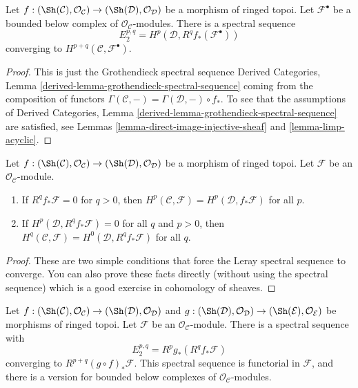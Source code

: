 \begin{lemma}
\label{lemma-Leray}
Let $f : (\Sh(\mathcal{C}), \mathcal{O}_\mathcal{C}) \to
(\Sh(\mathcal{D}), \mathcal{O}_\mathcal{D})$ be a morphism of ringed topoi.
Let $\mathcal{F}^\bullet$ be a bounded below complex of
$\mathcal{O}_\mathcal{C}$-modules. There is a spectral sequence
$$
E_2^{p, q} = H^p(\mathcal{D}, R^qf_*(\mathcal{F}^\bullet))
$$
converging to $H^{p + q}(\mathcal{C}, \mathcal{F}^\bullet)$.
\end{lemma}

\begin{proof}
This is just the Grothendieck spectral sequence
Derived Categories, Lemma \ref{derived-lemma-grothendieck-spectral-sequence}
coming from the composition of functors
$\Gamma(\mathcal{C}, -) = \Gamma(\mathcal{D}, -) \circ f_*$.
To see that the assumptions of
Derived Categories, Lemma \ref{derived-lemma-grothendieck-spectral-sequence}
are satisfied, see
Lemmas \ref{lemma-direct-image-injective-sheaf} and
\ref{lemma-limp-acyclic}.
\end{proof}

\begin{lemma}
\label{lemma-apply-Leray}
Let $f : (\Sh(\mathcal{C}), \mathcal{O}_\mathcal{C}) \to
(\Sh(\mathcal{D}), \mathcal{O}_\mathcal{D})$ be a morphism of ringed topoi.
Let $\mathcal{F}$ be an $\mathcal{O}_\mathcal{C}$-module.
\begin{enumerate}
\item If $R^qf_*\mathcal{F} = 0$ for $q > 0$, then
$H^p(\mathcal{C}, \mathcal{F}) = H^p(\mathcal{D}, f_*\mathcal{F})$ for all $p$.
\item If $H^p(\mathcal{D}, R^qf_*\mathcal{F}) = 0$ for all $q$ and $p > 0$,
then $H^q(\mathcal{C}, \mathcal{F}) = H^0(\mathcal{D}, R^qf_*\mathcal{F})$
for all $q$.
\end{enumerate}
\end{lemma}

\begin{proof}
These are two simple conditions that force the Leray spectral sequence to
converge. You can also prove these facts directly (without using the
spectral sequence) which is a good exercise in cohomology of sheaves.
\end{proof}

\begin{lemma}
\label{lemma-relative-Leray}
Let
$f : (\Sh(\mathcal{C}), \mathcal{O}_\mathcal{C}) \to
(\Sh(\mathcal{D}), \mathcal{O}_\mathcal{D})$
and
$g : (\Sh(\mathcal{D}), \mathcal{O}_\mathcal{D}) \to
(\Sh(\mathcal{E}), \mathcal{O}_\mathcal{E})$
be morphisms of ringed topoi.
Let $\mathcal{F}$ be an $\mathcal{O}_\mathcal{C}$-module.
There is a spectral sequence with
$$
E_2^{p, q} = R^pg_*(R^qf_*\mathcal{F})
$$
converging to $R^{p + q}(g \circ f)_*\mathcal{F}$.
This spectral sequence is functorial in $\mathcal{F}$, and there
is a version for bounded below complexes of $\mathcal{O}_\mathcal{C}$-modules.
\end{lemma}


